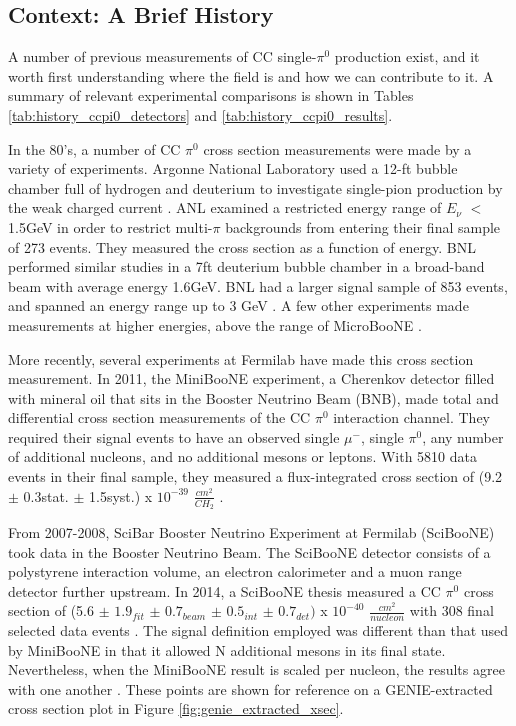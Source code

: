 \documentclass{article}
\begin{document}


\subsection{Context: A Brief History}
A number of previous measurements of CC single-$\pi^0$ production exist, and it worth first understanding where the field is and how we can contribute to it. A summary of relevant experimental comparisons is shown in Tables \ref{tab:history_ccpi0_detectors} and \ref{tab:history_ccpi0_results}.
\par In the 80's, a number of CC $\pi^0$ cross section measurements were made by a variety of experiments.  Argonne National Laboratory used a 12-ft bubble chamber full of hydrogen and deuterium to investigate single-pion production by the weak charged current \cite{bib:ANL1}. ANL examined a restricted energy range of $E_\nu$ $<$ 1.5GeV in order to restrict multi-$\pi$ backgrounds from entering their final sample of 273 events. They measured the cross section as a function of energy. BNL performed similar studies in a 7ft deuterium bubble chamber in a broad-band beam with average energy 1.6GeV. BNL had a larger signal sample of 853 events, and spanned an energy range up to 3 GeV \cite{bib:ANL2} \cite{bib:BNL}. A few other experiments made measurements at higher energies, above the range of MicroBooNE \cite{bib:HE_unknown1} \cite{bib:HE_unknown2}.
\par More recently, several experiments at Fermilab have made this cross section measurement. In 2011, the MiniBooNE experiment, a Cherenkov detector filled with mineral oil that sits in the Booster Neutrino Beam (BNB), made total and differential cross section measurements of the CC $\pi^0$ interaction channel. They required their signal events to have an observed single $\mu^-$, single $\pi^0$, any number of additional nucleons, and no additional mesons or leptons. With 5810 data events in their final sample, they measured a flux-integrated cross section of (9.2 $\pm$ 0.3stat. $\pm$ 1.5syst.) x $10^{-39}$ $\frac{cm^2}{CH_2}$ \cite{bib:numucc_miniboone} \cite{bib:miniboone_thesis}.  
\par From 2007-2008, SciBar Booster Neutrino Experiment at Fermilab (SciBooNE) took data in the Booster Neutrino Beam. The SciBooNE detector consists of a polystyrene interaction volume, an electron calorimeter and a muon range detector further upstream.  In 2014, a SciBooNE thesis measured a CC $\pi^0$ cross section of (5.6 $\pm$ $1.9_{fit}$ $\pm$ $0.7_{beam}$ $\pm$ $0.5_{int}$ $\pm$ $0.7_{det})$ x $10^{-40}$ $\frac{cm^2}{nucleon}$ with 308 final selected data events \cite{bib:sciboone_thesis}. The signal definition employed was different than that used by MiniBooNE in that it allowed N additional mesons in its final state.  Nevertheless, when the MiniBooNE result is scaled per nucleon, the results agree with one another .  These points are shown for reference on a GENIE-extracted cross section plot in Figure \ref{fig:genie_extracted_xsec}.  
\end{document}
